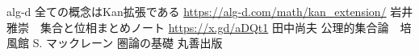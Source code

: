 \documentclass[dvipdfmx,a4paper,11pt]{report}
\theoremstyle{definition}
\begin{document}
\begin{comment}
\begin{thebibliography}{n}
\bibitem[alg]{alg}
alg-d 全ての概念はKan拡張である
\url{https://alg-d.com/math/kan_extension/}
\bibitem[Asg]{Asg}
Dagur Asgeirsson
\textit{The Foundations of Condensed Mathematics}
\url{https://dagur.sites.ku.dk/files/2022/01/condensed-foundations.pdf}
\bibitem[Bar22]{Bar22}
Michael Barz \textit{Condensed Mathematics}
\url{https://www.dropbox.com/scl/fi/xm2bs6jgtv9oaqir2slbt/condensed-final.pdf?rlkey=r1x82m3a135rfeec86jrjj79k&e=1&dl=0}
\bibitem[Fra]{Fra}
Martin Frankland \textit{Math 527 - Homotopy Theory
Additional notes}
\url{https://uregina.ca/~franklam/Math527/Math527_0204.pdf}
\bibitem[Land]{Land}
Marks Land
\textit{CONDENSED MATHEMATICS}
\url{https://www.markus-land.de/teaching/}
\bibitem[Lep]{Lep}
Florian Leptien
\textit{Master thesis Condensed Mathematics}
\bibitem[Sta]{Sta}
Stacks Project \textit{Site and sheaves}
\url{https://stacks.math.columbia.edu/download/sites.pdf}
\bibitem[Stum]{Stum}
Bernard Le Stum
\textit{An introduction to condensed mathematics}
\url{https://perso.univ-rennes1.fr/bernard.le-stum/bernard.le-stum/Enseignement_files/CondensedBook.pdf}
\bibitem[Str]{Str}
N. P. Strickland
\textit{THE CATEGORY OF CGWH SPACES}
\url{https://ncatlab.org/nlab/files/StricklandCGHWSpaces.pdf}
\bibitem[Sch19]{Sch19}
Peter Scholze
\textit{Lectures on Condensed Mathematics}
\url{https://www.math.uni-bonn.de/people/scholze/Condensed.pdf}
\bibitem[SchClau]{SchClau}
Peter Scholze, Dustin Clausen
\textit{Masterclass in Condensed Mathematics}
\url{https://www.math.ku.dk/english/calendar/events/condensed-mathematics/}
\bibitem[Sha1]{Sha1}
Shane Kelly \textit{Notes on the [HTT] proof of sheafification}
\url{https://www.ms.u-tokyo.ac.jp/~kelly/Course2023-24DAG/Sheafification.pdf}
\bibitem[Sha2]{Sha2}
Shane Kelly
\textit{Fast track guide to cardinals for use with Lurie’s Higher Topos Theory}
\url{https://www.ms.u-tokyo.ac.jp/~kelly/pdfs/cardinalsFastTrack.pdf}
\bibitem[Iwa22]{Iwa22}
岩井雅崇　集合と位相まとめノート
\url{https://x.gd/aDQt1}
\bibitem[田中]{Tana}
田中尚夫 公理的集合論　培風館
\bibitem[マックレーン]{Mac}
S. マックレーン 圏論の基礎 丸善出版
\end{thebibliography}
\end{comment}

\begin{thebibliography}{n}
alg-d 全ての概念はKan拡張である
\url{https://alg-d.com/math/kan_extension/}
岩井雅崇　集合と位相まとめノート
\url{https://x.gd/aDQt1}
田中尚夫 公理的集合論　培風館
S. マックレーン 圏論の基礎 丸善出版
\end{thebibliography}
 
\end{document}
